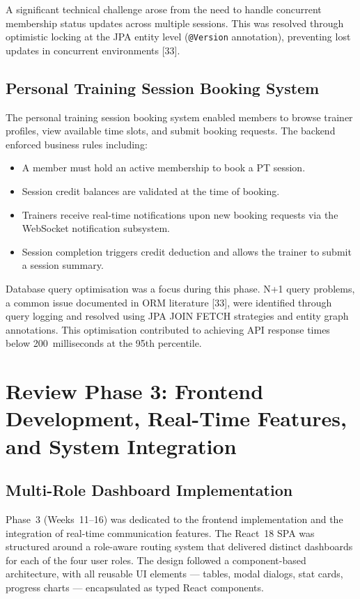 \documentclass[
  12pt,
  a4paperpaper,
]{report}
\providecommand{\tightlist}{%
  \setlength{\itemsep}{0pt}\setlength{\parskip}{0pt}}
\begin{document}
A significant technical challenge arose from the need to handle
concurrent membership status updates across multiple sessions. This
was resolved through optimistic locking at the JPA entity level
(\texttt{@Version} annotation), preventing lost updates in concurrent
environments {[}33{]}.

\subsection{Personal Training Session Booking
System}\label{pt-session-booking}

The personal training session booking system enabled members to
browse trainer profiles, view available time slots, and submit
booking requests. The backend enforced business rules including:

\begin{itemize}
\tightlist
\item A member must hold an active membership to book a PT session.
\item Session credit balances are validated at the time of booking.
\item Trainers receive real-time notifications upon new booking
  requests via the WebSocket notification subsystem.
\item Session completion triggers credit deduction and allows the
  trainer to submit a session summary.
\end{itemize}

Database query optimisation was a focus during this phase. N+1 query
problems, a common issue documented in ORM literature {[}33{]},
were identified through query logging and resolved using JPA JOIN
FETCH strategies and entity graph annotations. This optimisation
contributed to achieving API response times below 200~milliseconds
at the 95th percentile.


\section{Review Phase 3: Frontend Development, Real-Time Features,
and System Integration}\label{review-phase-3}

\subsection{Multi-Role Dashboard
Implementation}\label{multi-role-dashboard}

Phase~3 (Weeks~11--16) was dedicated to the frontend implementation
and the integration of real-time communication features. The
React~18 SPA was structured around a role-aware routing system that
delivered distinct dashboards for each of the four user roles. The
design followed a component-based architecture, with all reusable UI
elements --- tables, modal dialogs, stat cards, progress charts ---
encapsulated as typed React components.
\end{document}
